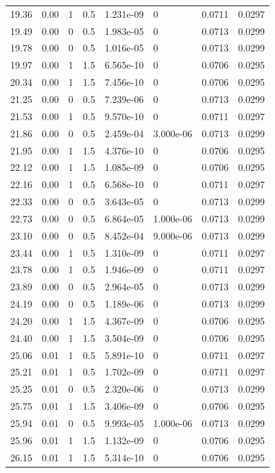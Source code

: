 \documentclass[preview]{standalone}
\begin{document}
{{{\begin{tabular}{L{1.2cm}C{1.2cm} C{0.3cm}C{0.5cm} C{1.4cm}C{1.4cm} C{1.4cm}C{1.4cm}}
  19.36  &  0.00  & 1     & 0.5 &  1.231e-09  & 0  & 0.0711 &  0.0297   \\ 
  19.49  &  0.00  & 0     & 0.5 &  1.983e-05  & 0  & 0.0713 &  0.0299   \\ 
  19.78  &  0.00  & 0     & 0.5 &  1.016e-05  & 0  & 0.0713 &  0.0299   \\ 
  19.97  &  0.00  & 1     & 1.5 &  6.565e-10  & 0  & 0.0706 &  0.0295   \\ 
  20.34  &  0.00  & 1     & 1.5 &  7.456e-10  & 0  & 0.0706 &  0.0295   \\ 
  21.25  &  0.00  & 0     & 0.5 &  7.239e-06  & 0  & 0.0713 &  0.0299   \\ 
  21.53  &  0.00  & 1     & 0.5 &  9.570e-10  & 0  & 0.0711 &  0.0297   \\ 
  21.86  &  0.00  & 0     & 0.5 &  2.459e-04  & 3.000e-06  & 0.0713 &  0.0299   \\ 
  21.95  &  0.00  & 1     & 1.5 &  4.376e-10  & 0  & 0.0706 &  0.0295   \\ 
  22.12  &  0.00  & 1     & 1.5 &  1.085e-09  & 0  & 0.0706 &  0.0295   \\ 
  22.16  &  0.00  & 1     & 0.5 &  6.568e-10  & 0  & 0.0711 &  0.0297   \\ 
  22.33  &  0.00  & 0     & 0.5 &  3.643e-05  & 0  & 0.0713 &  0.0299   \\ 
  22.73  &  0.00  & 0     & 0.5 &  6.864e-05  & 1.000e-06  & 0.0713 &  0.0299   \\ 
  23.10  &  0.00  & 0     & 0.5 &  8.452e-04  & 9.000e-06  & 0.0713 &  0.0299   \\ 
  23.44  &  0.00  & 1     & 0.5 &  1.310e-09  & 0  & 0.0711 &  0.0297   \\ 
  23.78  &  0.00  & 1     & 0.5 &  1.946e-09  & 0  & 0.0711 &  0.0297   \\ 
  23.89  &  0.00  & 0     & 0.5 &  2.964e-05  & 0  & 0.0713 &  0.0299   \\ 
  24.19  &  0.00  & 0     & 0.5 &  1.189e-06  & 0  & 0.0713 &  0.0299   \\ 
  24.20  &  0.00  & 1     & 1.5 &  4.367e-09  & 0  & 0.0706 &  0.0295   \\ 
  24.40  &  0.00  & 1     & 1.5 &  3.504e-09  & 0  & 0.0706 &  0.0295   \\ 
  25.06  &  0.01  & 1     & 0.5 &  5.891e-10  & 0  & 0.0711 &  0.0297   \\ 
  25.21  &  0.01  & 1     & 0.5 &  1.702e-09  & 0  & 0.0711 &  0.0297   \\ 
  25.25  &  0.01  & 0     & 0.5 &  2.320e-06  & 0  & 0.0713 &  0.0299   \\ 
  25.75  &  0.01  & 1     & 1.5 &  3.406e-09  & 0  & 0.0706 &  0.0295   \\ 
  25.94  &  0.01  & 0     & 0.5 &  9.993e-05  & 1.000e-06  & 0.0713 &  0.0299   \\ 
  25.96  &  0.01  & 1     & 1.5 &  1.132e-09  & 0  & 0.0706 &  0.0295   \\ 
  26.15  &  0.01  & 1     & 1.5 &  5.314e-10  & 0  & 0.0706 &  0.0295   \\ 
\hline 
\end{tabular} 

}}}
\end{document}
